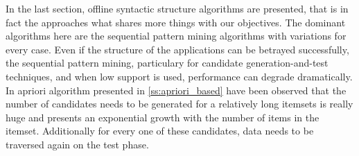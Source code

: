 In the last section, offline syntactic structure algorithms are presented, that
is in fact the approaches what shares more things with our objectives. The
dominant algorithms here are the sequential pattern mining algorithms with
variations for every case. Even if the structure of the applications can be
betrayed successfully, the sequential pattern mining, particulary for candidate 
generation-and-test techniques, and when low support is used, performance can 
degrade dramatically. In apriori algorithm presented in \ref{ss:apriori_based} 
have been observed that
the number of candidates needs to be generated for a relatively long itemsets is
really huge and presents an exponential growth with the number of items in the
itemset. Additionally for every one of these candidates, data needs to be
traversed again on the test phase.
